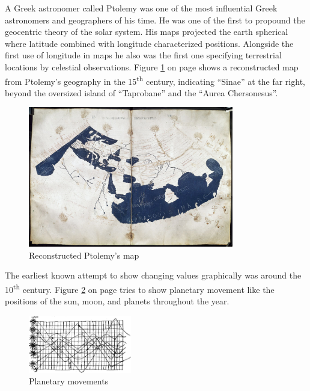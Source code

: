 A Greek astronomer called Ptolemy was one of the most influential Greek astronomers and geographers of his time. He was one of the first to propound the geocentric theory of the solar system. His maps projected the earth spherical where latitude combined with longitude characterized positions. Alongside the first use of longitude in maps he also was the first one specifying terrestrial locations by celestial observations. Figure \ref{fig:ptolemy} on page \pageref{fig:ptolemy} shows a reconstructed map from Ptolemy's geography in the 15\textsuperscript{th} century, indicating ``Sinae'' at the far right, beyond the oversized island of ``Taprobane'' and the ``Aurea Chersonesus''.

\begin{figure}[!htb]
\centering
\includegraphics[width=0.8\textwidth,keepaspectratio]{images/history/ptolemy-map.jpg}
\caption[
    Reconstructed Ptolemy's map, Urldate: 07.2016 \newline
\small\texttt{\url{https://upload.wikimedia.org/wikipedia/commons/2/23/PtolemyWorldMap.jpg}}
]{Reconstructed Ptolemy's map}
\label{fig:ptolemy}
\end{figure}

The earliest known attempt to show changing values graphically was around the 10\textsuperscript{th} century. Figure \ref{fig:planetary-movement} on page \pageref{fig:planetary-movement} tries to show planetary movement like the positions of the sun, moon, and planets throughout the year.

\begin{figure}[!htb]
\centering
\includegraphics[width=0.4\textwidth,keepaspectratio]{images/history/planetary-movement.jpg}
\caption[
    Planetary movements, Urldate: 07.2016 \newline
\small\texttt{\url{http://www.fi.uu.nl/wiskrant/artikelen/hist_grafieken/begin/images/planeten.gif}}
]{Planetary movements}
\label{fig:planetary-movement}
\end{figure}

